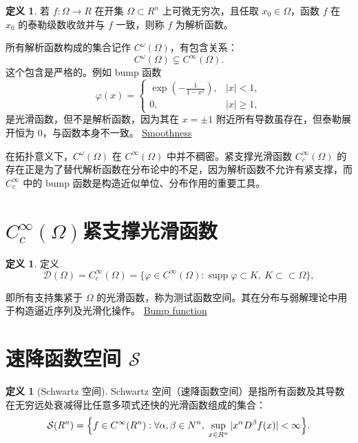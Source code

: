 \documentclass[12pt,a4paper]{article}
\newcommand{\R}{\mathbb{R}}                %
\newcommand{\N}{\mathbb{N}}                %
\DeclareMathOperator{\supp}{supp}           %
\def\R{R}%
\def\N{N}%
\theoremstyle{plain}
\theoremstyle{definition}
\newtheorem{definition}[theorem]{定义}
\theoremstyle{remark}
\begin{document}
	\begin{definition}
		若 $f:\Omega\to\R$ 在开集 $\Omega\subset\R^n$ 上可微无穷次，且任取 $x_0\in\Omega$，函数 $f$ 在 $x_0$ 的泰勒级数收敛并与 $f$ 一致，则称 $f$ 为解析函数。
	\end{definition}
	
	所有解析函数构成的集合记作 $C^\omega(\Omega)$，有包含关系：
	\[
	C^\omega(\Omega)\subsetneq C^\infty(\Omega).
	\]
	这个包含是严格的。例如 bump 函数
	\[
	\varphi(x)=
	\begin{cases}
		\exp\left(-\frac{1}{1-x^2}\right), & |x|<1, \\
		0, & |x|\ge 1,
	\end{cases}
	\]
	是光滑函数，但不是解析函数，因为其在 $x=\pm 1$ 附近所有导数虽存在，但泰勒展开恒为 0，与函数本身不一致。
\href{https://en.wikipedia.org/wiki/Smoothness}{Smoothness}
	
	在拓扑意义下，$C^\omega(\Omega)$ 在 $C^\infty(\Omega)$ 中并不稠密。紧支撑光滑函数 $C_c^\infty(\Omega)$ 的存在正是为了替代解析函数在分布论中的不足，因为解析函数不允许有紧支撑，而 $C_c^\infty$ 中的 bump 函数是构造近似单位、分布作用的重要工具。
	
	\section{\texorpdfstring{$C_c^\infty(\Omega)$}{Cc∞}紧支撑光滑函数}
	
	\begin{definition}
		定义
		\[
		\mathcal D(\Omega)=	C_c^\infty(\Omega)
		=\{\varphi\in C^\infty(\Omega):\supp\varphi\subset K,\ K\subset\subset\Omega\},
		\]
		
		
		即所有支持集紧于 $\Omega$ 的光滑函数，称为测试函数空间。其在分布与弱解理论中用于构造逼近序列及光滑化操作。
		\href{https://en.wikipedia.org/wiki/Bump_function}{Bump function}
	\end{definition}
	
\section{速降函数空间 $\mathcal S$}

\begin{definition}[Schwartz 空间]
	Schwartz 空间（速降函数空间）是指所有函数及其导数在无穷远处衰减得比任意多项式还快的光滑函数组成的集合：
	\[
	\mathcal S(\R^n)
	=\Bigl\{f\in C^\infty(\R^n):
	\forall\alpha,\beta\in\N^n,\;\sup_{x\in\R^n}|x^\alpha D^\beta f(x)|<\infty\Bigr\}.
	\]
\end{definition}
\end{document}
